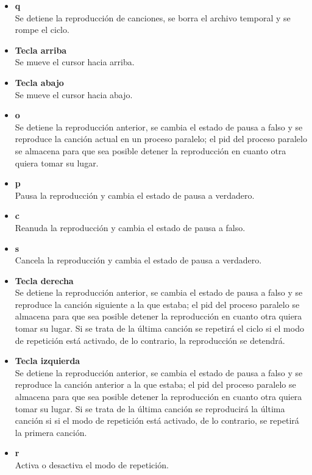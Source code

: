 \documentclass[12pt,a4paper]{article}
\begin{document}
    \begin{itemize}
        \item \textbf{q} \\
        Se detiene la reproducción de canciones, se borra el archivo temporal y se rompe el ciclo.
        \item \textbf{Tecla arriba} \\
        Se mueve el cursor hacia arriba.
        \item \textbf{Tecla abajo} \\
        Se mueve el cursor hacia abajo.
        \item \textbf{o} \\
        Se detiene la reproducción anterior, se cambia el estado de pausa a falso y se reproduce la canción actual en un proceso paralelo; el pid del proceso paralelo se almacena para que sea posible detener la reproducción en cuanto otra quiera tomar su lugar.
        \item \textbf{p} \\
        Pausa la reproducción y cambia el estado de pausa a verdadero.
        \item \textbf{c} \\
        Reanuda la reproducción y cambia el estado de pausa a falso.
        \item \textbf{s} \\
        Cancela la reproducción y cambia el estado de pausa a verdadero.
        \item \textbf{Tecla derecha} \\
        Se detiene la reproducción anterior, se cambia el estado de pausa a falso y se reproduce la canción siguiente a la que estaba; el pid del proceso paralelo se almacena para que sea posible detener la reproducción en cuanto otra quiera tomar su lugar. Si se trata de la última canción se repetirá el ciclo si el modo de repetición está activado, de lo contrario, la reproducción se detendrá.
        \item \textbf{Tecla izquierda} \\
        Se detiene la reproducción anterior, se cambia el estado de pausa a falso y se reproduce la canción anterior a la que estaba; el pid del proceso paralelo se almacena para que sea posible detener la reproducción en cuanto otra quiera tomar su lugar. Si se trata de la última canción se reproducirá la última canción si si el modo de repetición está activado, de lo contrario, se repetirá la primera canción.
        \item \textbf{r} \\
        Activa o desactiva el modo de repetición.
    \end{itemize}
    
\end{document}
